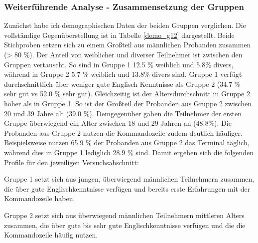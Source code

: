 \subsubsection{Weiterführende Analyse - Zusammensetzung der Gruppen}
Zunächst habe ich demographischen Daten der beiden Gruppen verglichen. Die vollständige Gegenüberstellung ist in Tabelle \ref{demo_g12} dargestellt. Beide Stichproben setzen sich zu einem Großteil aus männlichen Probanden zusammen (> 80 \%). Der Anteil von weiblicher und diverser Teilnehmer ist zwischen den Gruppen vertauscht. So sind in Gruppe 1 12.5 \% weiblich und 5.8\% divers, während in Gruppe 2 5.7 \% weiblich und 13.8\% divers sind. Gruppe 1 verfügt durchschnittlich über weniger gute Englisch Kenntnisse als Gruppe 2 (34.7 \% sehr gut vs 52.0 \% sehr gut). Gleichzeitig ist der Altersdurchschnitt in Gruppe 2 höher als in Gruppe 1. So ist der Großteil der Probanden aus Gruppe 2 zwischen 20 und 39 Jahre alt (39.0 \%). Demgegenüber gaben die Teilnehmer der ersten Gruppe überwiegend ein Alter zwischen 18 und 29 Jahren an (48.8\%). Die Probanden aus Gruppe 2 nutzen die Kommandozeile zudem deutlich häufiger. Beispielsweise nutzen 65.9 \% der Probanden aus Gruppe 2 das Terminal täglich, während dies in Gruppe 1 lediglich 28.9 \% sind. Damit ergeben sich die folgenden Profile für den jeweiligen Versuchsabschnitt:

Gruppe 1 setzt sich aus jungen, überwiegend männlichen Teilnehmern zusammen, die über gute Englischkenntnisse verfügen und bereits erste Erfahrungen mit der Kommandozeile haben. 

Gruppe 2 setzt sich aus überwiegend männlichen Teilnehmern mittleren Alters zusammen, die über gute bis sehr gute Englischkenntnisse verfügen und die die Kommandozeile häufig nutzen. 

